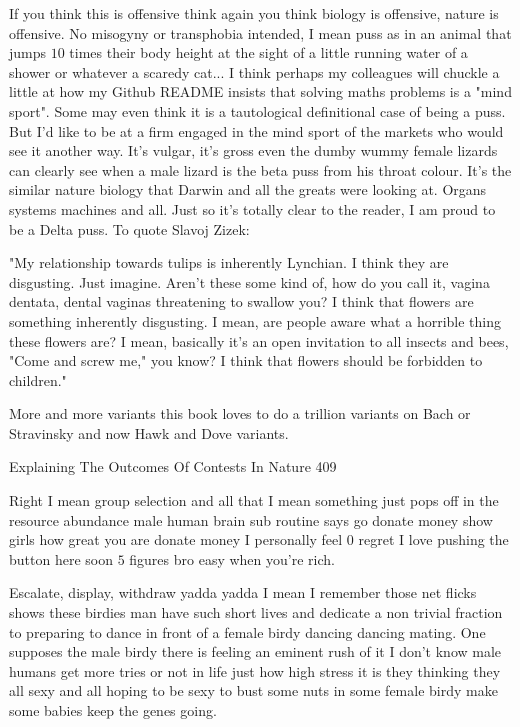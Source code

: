 If you think this is offensive think again you think biology is offensive, nature is offensive. No misogyny or transphobia intended, I mean puss as in an animal that jumps $10$ times their body height at the sight of a little running water of a shower or whatever a scaredy cat... I think perhaps my colleagues will chuckle a little at how my Github README insists that solving maths problems is a "mind sport". Some may even think it is a tautological definitional case of being a puss. But I'd like to be at a firm engaged in the mind sport of the markets who would see it another way. It's vulgar, it's gross even the dumby wummy female lizards can clearly see when a male lizard is the beta puss from his throat colour. It's the similar nature biology that Darwin and all the greats were looking at. Organs systems machines and all. Just so it's totally clear to the reader, I am proud to be a Delta puss. To quote Slavoj Zizek:

"My relationship towards tulips is inherently Lynchian. I think they are disgusting. Just imagine. Aren't these some kind of, how do you call it, vagina dentata, dental vaginas threatening to swallow you? I think that flowers are something inherently disgusting. I mean, are people aware what a horrible thing these flowers are? I mean, basically it's an open invitation to all insects and bees, "Come and screw me," you know? I think that flowers should be forbidden to children."

More and more variants this book loves to do a trillion variants on Bach or Stravinsky and now Hawk and Dove variants.

Explaining The Outcomes Of Contests In Nature 409

Right I mean group selection and all that I mean something just pops off in the resource abundance male human brain sub routine says go donate money show girls how great you are donate money I personally feel $0$ regret I love pushing the button here soon $5$ figures bro easy when you're rich.

Escalate, display, withdraw yadda yadda I mean I remember those net flicks shows these birdies man have such short lives and dedicate a non trivial fraction to preparing to dance in front of a female birdy dancing dancing mating. One supposes the male birdy there is feeling an eminent rush of it I don't know male humans get more tries or not in life just how high stress it is they thinking they all sexy and all hoping to be sexy to bust some nuts in some female birdy make some babies keep the genes going.

